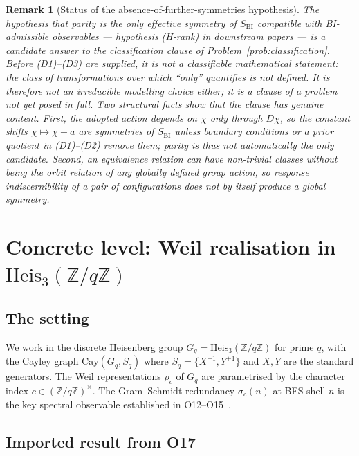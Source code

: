 \documentclass[11pt,a4paper]{article}
\newtheorem{remark}[theorem]{Remark}
\newcommand{\Heis}{\mathrm{Heis}_{3}(\mathbb{Z}/q\mathbb{Z})}
\newcommand{\chifield}{\chi}
\newcommand{\rhoc}{\rho_{c}}
\newcommand{\Cay}{\mathrm{Cay}}
\begin{document}
    \begin{remark}[Status of the absence-of-further-symmetries hypothesis]
      \label{rem:hrank-status}
      The hypothesis that parity is the only effective symmetry of $S_{\mathrm{BI}}$
      compatible with BI-admissible observables --- hypothesis (H-rank) in downstream
      papers --- is a candidate answer to the classification clause of
      Problem~\ref{prob:classification}.
      Before (D1)--(D3) are supplied, it is not a classifiable mathematical statement: the
      class of transformations over which ``only'' quantifies is not defined.
      It is therefore not an irreducible modelling choice either; it is a clause of a
      problem not yet posed in full.
      Two structural facts show that the clause has genuine content.
      First, the adopted action depends on $\chifield$ only through $D\chifield$, so the
      constant shifts $\chifield \mapsto \chifield + a$ are symmetries of
      $S_{\mathrm{BI}}$ unless boundary conditions or a prior quotient in (D1)--(D2) remove
      them; parity is thus not automatically the only candidate.
      Second, an equivalence relation can have non-trivial classes without being the orbit
      relation of any globally defined group action, so response indiscernibility of a pair
      of configurations does not by itself produce a global symmetry.
    \end{remark}

  \section{Concrete level: Weil realisation in $\Heis$}
  \label{sec:concrete}

  \subsection{The setting}
    \label{ssec:setting}

    We work in the discrete Heisenberg group $G_q = \Heis$ for prime $q$, with the Cayley
    graph $\Cay(G_q, S_q)$ where $S_q = \{X^{\pm 1}, Y^{\pm 1}\}$ and $X, Y$ are the
    standard generators.
    The Weil representations $\rhoc$ of $G_q$ are parametrised by the character index
    $c \in (\mathbb{Z}/q\mathbb{Z})^{\times}$.
    The Gram--Schmidt redundancy $\sigma_c(n)$ at BFS shell $n$ is the key spectral
    observable established in O12--O15~\cite{Beau2026a16,Beau2026a17,Beau2026a18,Beau2026a19}.

  \subsection{Imported result from O17}
    \label{ssec:O17}
\end{document}
